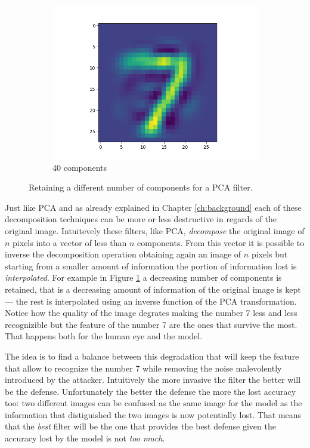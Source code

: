 \begin{figure}
\begin{subfigure}{0.3\linewidth}
    \includegraphics[width=\linewidth]{filtered-input-pca-40-components.png}
    \caption{40 components}
  \end{subfigure}
  \caption{Retaining a different number of components for a PCA filter.}
  \label{fig:various-pca-reductions}
\end{figure}

Just like PCA and as already explained in Chapter \ref{ch:background}
each of these decomposition techniques can be more or less destructive
in regards of the original image. Intuitevely these filters, like PCA,
\emph{decompose} the original image of $n$ pixels into a vector of less
than $n$ components. From this vector it is possible to inverse the
decomposition operation obtaining again an image of $n$ pixels but
starting from a smaller amount of information the portion of
information lost is \emph{interpolated}. For example in Figure
\ref{fig:various-pca-reductions} a decreasing number of components is
retained, that is a decreasing amount of information of the original
image is kept --- the rest is interpolated using an inverse function of
the PCA transformation. Notice how the quality of the image degrates
making the number 7 less and less recognizible but the feature of the
number 7 are the ones that survive the most. That happens both for the
human eye and the model.

The idea is to find a balance between this degradation that will keep
the feature that allow to recognize the number 7 while removing the
noise malevolently introduced by the attacker. Intuitively the more
invasive the filter the better will be the defense. Unfortunately the
better the defense the more the lost accuracy too: two different images
can be confused as the same image for the model as the information that
distiguished the two images is now potentially lost. That means that
the \emph{best} filter will be the one that provides the best defense
given the accuracy lost by the model is not \emph{too much}.

